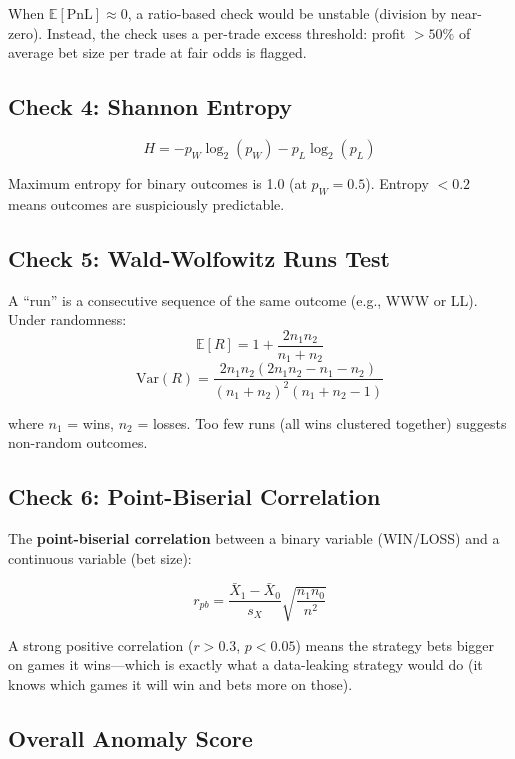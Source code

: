 \documentclass[12pt,a4paper]{report}
\theoremstyle{definition}
\newcommand{\pnl}{\text{PnL}}
\newcommand{\E}{\mathbb{E}}
\begin{document}
When $\E[\pnl] \approx 0$, a ratio-based check would be unstable (division by near-zero). Instead, the check uses a per-trade excess threshold: profit $> 50\%$ of average bet size per trade at fair odds is flagged.

\subsection{Check 4: Shannon Entropy}
\begin{equation}
    H = -p_W \log_2(p_W) - p_L \log_2(p_L)
\end{equation}

Maximum entropy for binary outcomes is 1.0 (at $p_W = 0.5$). Entropy $< 0.2$ means outcomes are suspiciously predictable.

\subsection{Check 5: Wald-Wolfowitz Runs Test}

A ``run'' is a consecutive sequence of the same outcome (e.g., WWW or LL). Under randomness:
\begin{equation}
    \E[R] = 1 + \frac{2n_1 n_2}{n_1 + n_2}
\end{equation}
\begin{equation}
    \text{Var}(R) = \frac{2n_1 n_2 (2n_1 n_2 - n_1 - n_2)}{(n_1 + n_2)^2 (n_1 + n_2 - 1)}
\end{equation}

where $n_1$ = wins, $n_2$ = losses. Too few runs (all wins clustered together) suggests non-random outcomes.

\subsection{Check 6: Point-Biserial Correlation}

The \textbf{point-biserial correlation} between a binary variable (WIN/LOSS) and a continuous variable (bet size):

\begin{equation}
    r_{pb} = \frac{\bar{X}_1 - \bar{X}_0}{s_X} \sqrt{\frac{n_1 n_0}{n^2}}
\end{equation}

A strong positive correlation ($r > 0.3$, $p < 0.05$) means the strategy bets bigger on games it wins—which is exactly what a data-leaking strategy would do (it knows which games it will win and bets more on those).

\subsection{Overall Anomaly Score}
\end{document}
